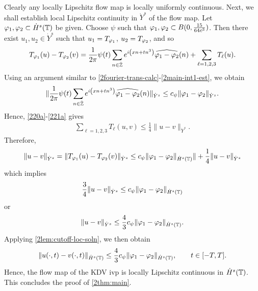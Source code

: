 %
%
Clearly any locally Lipschitz flow map is locally uniformly continuous. 
Next, we shall establish local Lipschitz continuity in $\dot{Y}^s$ of the flow
map. Let $\varphi_1, \varphi_2 \subset \dot{H}^s(\mathbb{T})$ be given. Choose $\psi$ such that
$\varphi_1, \varphi_2 \subset B(0, \frac{15}{64c^{3}})$.  Then there exist $u_1, u_2 \in
\dot{Y}^s$ such that $u_1 = T_{\varphi_1}$, $u_2 = T_{\varphi_2}$, and so
%
%
\begin{equation*}
	\begin{split}
		T_{\varphi_1}(u) - T_{\varphi_2}(v) = \frac{1}{2\pi} \psi(t) \sum_{n \in
		\dot{\mathbb{Z}}}e^{i\left( xn + tn^{3} \right)} \widehat{\varphi_1 - \varphi_2}(n) + \sum_{\ell
		= 1,2,3} T_{\ell}(u).
	\end{split}
\end{equation*}
%
%
Using an argument similar to \eqref{2fourier-trans-calc}-\eqref{2main-int1-est},
we obtain
%
%
\begin{equation*}
	\begin{split}
		\| \frac{1}{2\pi} \psi(t) \sum_{n \in
		\dot{\mathbb{Z}}}e^{i\left( xn + tn^{3} \right)} \widehat{\varphi_1 - \varphi_2}(n)\|_{\dot{Y}^s}
		\le c_\psi \|\varphi_{1} - \varphi_{2}\|_{\dot{Y}^s}.
	\end{split}
\end{equation*}
%
%
Hence, \eqref{220a}-\eqref{221a} gives
%
%
\begin{equation*}
	\begin{split}
		\sum_{\ell=1,2,3} T_{\ell}(u,v) \le \frac{1}{4}\|u-v\|_{\dot{Y}^s}.
	\end{split}
\end{equation*}
%
%
Therefore,
%
%
\begin{equation*}
	\begin{split}
		\|u -v \|_{\dot{Y}^s} = \|T_{\varphi_1}(u) - T_{\varphi_2}(v) \|_{\dot{Y}^s} \le c_\psi
		\|\varphi_{1} - \varphi_{2} \|_{\dot{H}^s\left( \mathbb{T} \right)}\| +
		\frac{1}{4} \|u -v \|_{\dot{Y}^s}
	\end{split}
\end{equation*}
%
%
which implies
%
%
\begin{equation*}
	\begin{split}
		\frac{3}{4} \|u-v\|_{\dot{Y}^s} \le c_\psi \|\varphi_1 - \varphi_2 \|_{\dot{H}^s(\mathbb{T})}
	\end{split}
\end{equation*}
%
%
or
%
%
\begin{equation*}
	\begin{split}
		\|u -v \|_{\dot{Y}^s} \le \frac{4}{3} c_\psi \|\varphi_1 - \varphi_2 \|_{\dot{H}^s(\mathbb{T})}.
	\end{split}
\end{equation*}
%
%
Applying \cref{2lem:cutoff-loc-soln}, we then obtain
%
%
	 \begin{equation*}
		 \begin{split}
			\|u(\cdot, t) -v(\cdot, t) \|_{\dot{H}^s(\mathbb{T})} \le \frac{4}{3} c_\psi \|\varphi_1 -
			\varphi_2 \|_{\dot{H}^s(\mathbb{T})}, \qquad t \in [-T, T].
		 \end{split}
	 \end{equation*}
Hence, the flow map of the KDV ivp is locally Lipschitz continuous in
$\dot{H}^s(\mathbb{T})$. This
concludes the proof of \cref{2thm:main}. \qquad \qedsymbol
%
%
%
%
